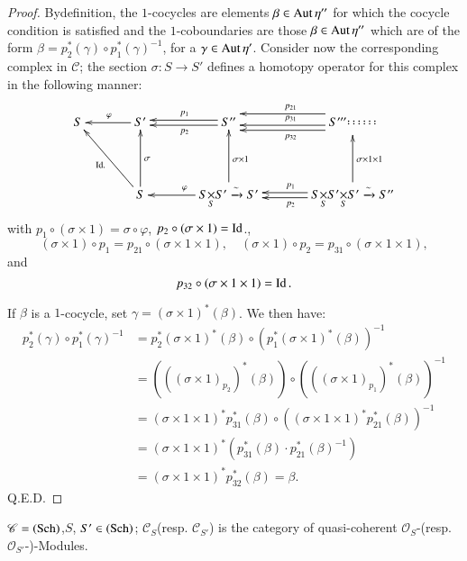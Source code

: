 \begin{proof}
By\pageoriginale definition, the $1$-cocycles are elements $\beta\in
\operatorname{Aut} \eta''$ for which the cocycle condition is satisfied and the
$1$-coboundaries are those $\beta\in \operatorname{Aut} \eta''$ which are of the
form $\beta=p^{\ast}_{2}(\gamma)\circ p^{\ast}_{1}(\gamma)^{-1}$, for
a $\gamma\in \operatorname{Aut} \eta'$. Consider now the corresponding complex in
$\mathscr{C}$; the section $\sigma:S\to S'$ defines a homotopy operator
for this complex in the following manner:
\[
\xymatrix@=1.25cm{
S & S'\ar[l]_{\varphi} & S''\ar@<-.2em>[l]_{p_{1}}\ar@<.2em>[l]^{p_{2}} &
S'''\ar@<-.7em>[l]_{p_{21}}\ar@<.2em>[l]_{p_{31}}\ar@<.6em>[l]^{p_{32}}
\mbox{$\begin{matrix}\cdots\cdots\\[-10pt] \cdots\cdots\end{matrix}$}\\ 
 & S\ar[ul]^{\text{Id.}}\ar[u]_{\sigma} &
    \fprod{S}{S'}{S}\xrightarrow{\sim}
    S'\ar[l]_{\varphi}\ar[u]_{\sigma\times 1} & \ar@<-.2em>[l]_{p_{1}}\ar@<.2em>[l]^{p_{2}}
    \fprod{S}{\fprod{S'}{S'}{S}}{S}\xrightarrow{\sim} S''
    \ar[u]_{\sigma\times 1\times 1} 
}
\]
with $p_{1}\circ(\sigma\times 1)=\sigma\circ \varphi$,
$p_{2}\circ(\sigma\times 1)=\operatorname{Id}$.,
$$
(\sigma\times 1)\circ p_{1}=p_{21}\circ(\sigma\times 1\times 1),\quad
(\sigma\times 1)\circ p_{2}=p_{31}\circ(\sigma\times 1\times 1),
$$
and
$$
p_{32}\circ(\sigma\times 1\times 1)=\operatorname{Id}.
$$

If $\beta$ is a $1$-cocycle, set $\gamma=(\sigma\times
1)^{\ast}(\beta)$. We then have:
\begin{align*}
p^{\ast}_{2}(\gamma)\circ p^{\ast}_{1}(\gamma)^{-1} &=
p^{\ast}_{2}(\sigma\times 1)^{\ast}(\beta)\circ
(p^{\ast}_{1}(\sigma\times 1)^{\ast}(\beta))^{-1}\\[5pt]
&= (((\sigma\times 1)_{p_{2}})^{\ast}(\beta))\circ(((\sigma\times
1)_{p_{1}})^{\ast}(\beta))^{-1}\\[4pt]
&= (\sigma\times 1\times
1)^{\ast}p^{\ast}_{31}(\beta)\circ((\sigma\times 1\times
1)^{\ast}p^{\ast}_{21}(\beta))^{-1}\\[4pt] 
&= (\sigma\times 1\times 1)^{\ast}(p^{\ast}_{31}(\beta)\cdot
p^{\ast}_{21}(\beta)^{-1})\\[4pt] 
&= (\sigma\times 1\times 1)^{\ast}p^{\ast}_{32}(\beta)=\beta.
\end{align*}
\hfill Q.E.D.
\end{proof}

\setcounter{exam}{1}
\begin{exam}%
$\mathscr{C}=(\operatorname{Sch})$,\pageoriginale $S$, $S'\in(\operatorname{Sch})$;
  $\mathscr{C}_{S}$(resp. $\mathscr{C}_{S'}$) is the category of
  quasi-coherent $\mathscr{O}_{S}$-(resp. $\mathscr{O}_{S'}$-)-Modules.
\end{exam}

